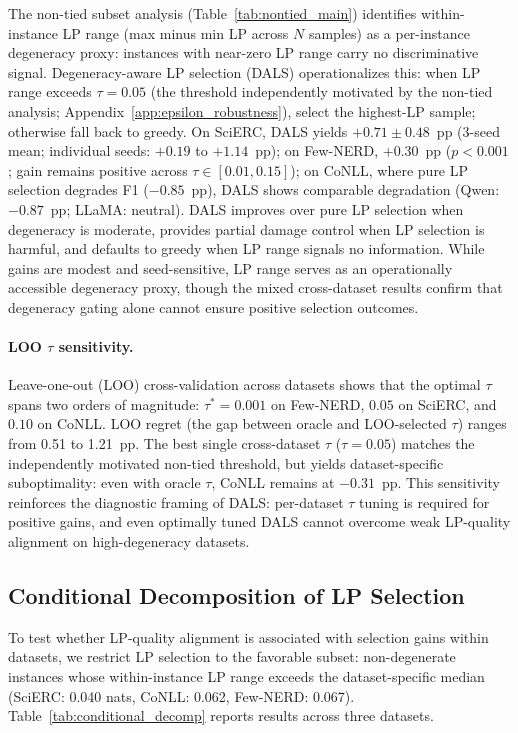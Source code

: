 The non-tied subset analysis (Table~\ref{tab:nontied_main}) identifies within-instance LP range (max minus min LP across $N$ samples) as a per-instance degeneracy proxy: instances with near-zero LP range carry no discriminative signal.
Degeneracy-aware LP selection (DALS) operationalizes this: when LP range exceeds $\tau{=}0.05$ (the threshold independently motivated by the non-tied analysis; Appendix~\ref{app:epsilon_robustness}), select the highest-LP sample; otherwise fall back to greedy.
On SciERC, DALS yields $+0.71{\pm}0.48$~pp (3-seed mean; individual seeds: $+0.19$ to $+1.14$~pp); on Few-NERD, $+0.30$~pp ($p{<}0.001$; gain remains positive across $\tau \in [0.01, 0.15]$); on CoNLL, where pure LP selection degrades F1 ($-0.85$~pp), DALS shows comparable degradation (Qwen: $-0.87$~pp; LLaMA: neutral).
DALS improves over pure LP selection when degeneracy is moderate, provides partial damage control when LP selection is harmful, and defaults to greedy when LP range signals no information.
While gains are modest and seed-sensitive, LP range serves as an operationally accessible degeneracy proxy, though the mixed cross-dataset results confirm that degeneracy gating alone cannot ensure positive selection outcomes.

\paragraph{LOO $\tau$ sensitivity.}
Leave-one-out (LOO) cross-validation across datasets shows that the optimal $\tau$ spans two orders of magnitude: $\tau^*{=}0.001$ on Few-NERD, $0.05$ on SciERC, and $0.10$ on CoNLL.
LOO regret (the gap between oracle and LOO-selected $\tau$) ranges from 0.51 to 1.21~pp.
The best single cross-dataset $\tau$ ($\tau{=}0.05$) matches the independently motivated non-tied threshold, but yields dataset-specific suboptimality: even with oracle $\tau$, CoNLL remains at $-0.31$~pp.
This sensitivity reinforces the diagnostic framing of DALS: per-dataset $\tau$ tuning is required for positive gains, and even optimally tuned DALS cannot overcome weak LP-quality alignment on high-degeneracy datasets.

\subsection{Conditional Decomposition of LP Selection}\label{app:conditional_decomp}

To test whether LP-quality alignment is associated with selection gains within datasets, we restrict LP selection to the favorable subset: non-degenerate instances whose within-instance LP range exceeds the dataset-specific median (SciERC: 0.040 nats, CoNLL: 0.062, Few-NERD: 0.067).
Table~\ref{tab:conditional_decomp} reports results across three datasets.

